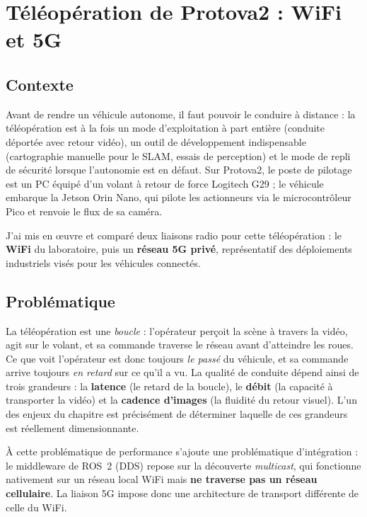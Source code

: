 \chapter{Téléopération de Protova2 : WiFi et 5G}
\chapminitoc
\label{chap:teleop}

\section{Contexte}

Avant de rendre un véhicule autonome, il faut pouvoir le conduire à distance :
la téléopération est à la fois un mode d'exploitation à part entière (conduite
déportée avec retour vidéo), un outil de développement indispensable
(cartographie manuelle pour le SLAM, essais de perception) et le mode de repli
de sécurité lorsque l'autonomie est en défaut. Sur Protova2, le poste de
pilotage est un PC équipé d'un volant à retour de force Logitech G29 ; le
véhicule embarque la Jetson Orin Nano, qui pilote les actionneurs via le
microcontrôleur Pico et renvoie le flux de sa caméra.

J'ai mis en œuvre et comparé deux liaisons radio pour cette téléopération : le
\textbf{WiFi} du laboratoire, puis un \textbf{réseau 5G privé}, représentatif
des déploiements industriels visés pour les véhicules connectés.

\section{Problématique}

La téléopération est une \emph{boucle} : l'opérateur perçoit la scène à
travers la vidéo, agit sur le volant, et sa commande traverse le réseau avant
d'atteindre les roues. Ce que voit l'opérateur est donc toujours \emph{le
passé} du véhicule, et sa commande arrive toujours \emph{en retard} sur ce
qu'il a vu. La qualité de conduite dépend ainsi de trois grandeurs : la
\textbf{latence} (le retard de la boucle), le \textbf{débit} (la capacité à
transporter la vidéo) et la \textbf{cadence d'images} (la fluidité du retour
visuel). L'un des enjeux du chapitre est précisément de déterminer laquelle de
ces grandeurs est réellement dimensionnante.

À cette problématique de performance s'ajoute une problématique
d'intégration : le middleware de ROS~2 (DDS) repose sur la découverte
\emph{multicast}, qui fonctionne nativement sur un réseau local WiFi mais
\textbf{ne traverse pas un réseau cellulaire}. La liaison 5G impose donc une
architecture de transport différente de celle du WiFi.

